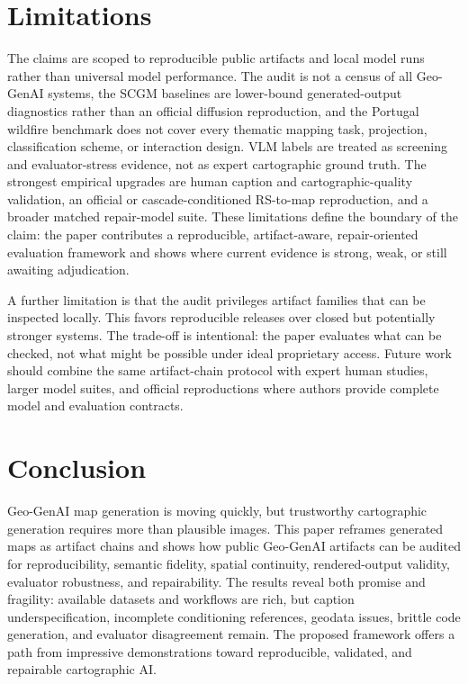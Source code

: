 \documentclass[]{interact}
\begin{document}
\section{Limitations}

The claims are scoped to reproducible public artifacts and local model runs rather than universal model performance. The audit is not a census of all Geo-GenAI systems, the SCGM baselines are lower-bound generated-output diagnostics rather than an official diffusion reproduction, and the Portugal wildfire benchmark does not cover every thematic mapping task, projection, classification scheme, or interaction design. VLM labels are treated as screening and evaluator-stress evidence, not as expert cartographic ground truth. The strongest empirical upgrades are human caption and cartographic-quality validation, an official or cascade-conditioned RS-to-map reproduction, and a broader matched repair-model suite. These limitations define the boundary of the claim: the paper contributes a reproducible, artifact-aware, repair-oriented evaluation framework and shows where current evidence is strong, weak, or still awaiting adjudication.

A further limitation is that the audit privileges artifact families that can be inspected locally. This favors reproducible releases over closed but potentially stronger systems. The trade-off is intentional: the paper evaluates what can be checked, not what might be possible under ideal proprietary access. Future work should combine the same artifact-chain protocol with expert human studies, larger model suites, and official reproductions where authors provide complete model and evaluation contracts.

\section{Conclusion}

Geo-GenAI map generation is moving quickly, but trustworthy cartographic generation requires more than plausible images. This paper reframes generated maps as artifact chains and shows how public Geo-GenAI artifacts can be audited for reproducibility, semantic fidelity, spatial continuity, rendered-output validity, evaluator robustness, and repairability. The results reveal both promise and fragility: available datasets and workflows are rich, but caption underspecification, incomplete conditioning references, geodata issues, brittle code generation, and evaluator disagreement remain. The proposed framework offers a path from impressive demonstrations toward reproducible, validated, and repairable cartographic AI.
\end{document}
